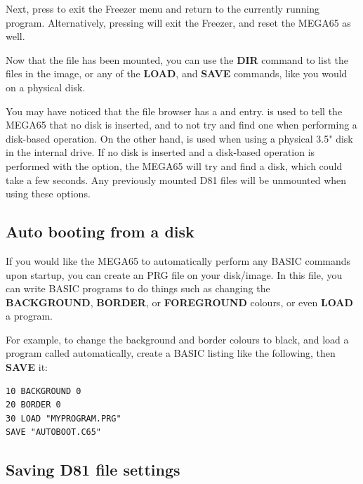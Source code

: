 Next, press  to exit the Freezer menu and return to the currently running program. Alternatively,
pressing  will exit the Freezer, and reset the MEGA65 as well.

Now that the file has been mounted, you can use
the {\bf DIR} command to list the files in the image, or any of the {\bf LOAD}, and {\bf SAVE} commands, like you
would on a physical disk.

You may have noticed that the file browser has a  and 
entry.  is used to tell
the MEGA65 that no disk is inserted, and to not try and find one when performing a disk-based operation. On the other
hand,  is used when using a physical 3.5" disk in the internal drive. If no disk is
inserted and a disk-based operation is performed with the  option, the MEGA65 will
try and find a disk, which could take a few seconds. Any previously mounted D81 files will be unmounted when using
these options.


\subsection{Auto booting from a disk}
If you would like the MEGA65 to automatically perform any BASIC commands upon startup, you can create an
 PRG file on your disk/image. In this file, you can write BASIC programs to do things such
as changing the {\bf BACKGROUND}, {\bf BORDER}, or {\bf FOREGROUND} colours, or even {\bf LOAD} a program.

For example, to change the background and border colours to black, and load a program called 
automatically, create a BASIC listing like the following, then {\bf SAVE} it:


\begin{tcolorbox}[colback=black,coltext=white]
\verbatimfont{\codefont}
\begin{verbatim}
10 BACKGROUND 0
20 BORDER 0
30 LOAD "MYPROGRAM.PRG"
SAVE "AUTOBOOT.C65"
\end{verbatim}
\end{tcolorbox}

\subsection{Saving D81 file settings}

